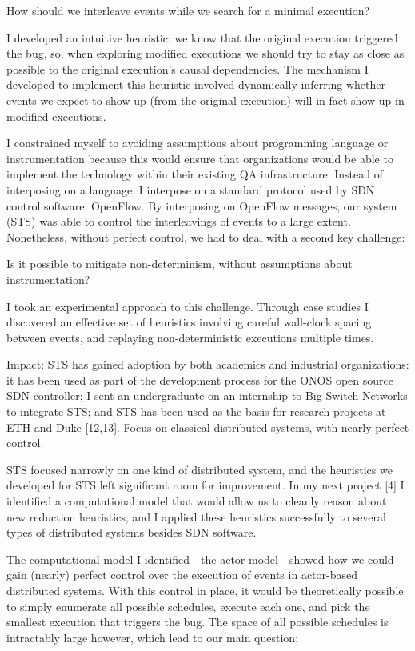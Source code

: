 	How should we interleave events while we search for a minimal execution?

I developed an intuitive heuristic: we know that the original execution triggered the bug, so, when exploring modified executions we should try to stay as close as possible to the original execution’s causal dependencies. The mechanism I developed to implement this heuristic involved dynamically inferring whether events we expect to show up (from the original execution) will in fact show up in modified executions.

I constrained myself to avoiding assumptions about programming language or instrumentation because this would ensure that organizations would be able to implement the technology within their existing QA infrastructure. Instead of interposing on a language, I interpose on a standard protocol used by SDN control software: OpenFlow. By interposing on OpenFlow messages, our system (STS) was able to control the interleavings of events to a large extent. Nonetheless, without perfect control, we had to deal with a second key challenge:

Is it possible to mitigate non-determinism, without assumptions about instrumentation?

I took an experimental approach to this challenge. Through case studies I discovered an effective set of heuristics involving careful wall-clock spacing between events, and replaying non-deterministic executions multiple times.

Impact: STS has gained adoption by both academics and industrial organizations: it has been used as part of the development process for the ONOS open source SDN controller; I sent an undergraduate on an internship to Big Switch Networks to integrate STS; and STS has been used as the basis for research projects at ETH and Duke [12,13].
Focus on classical distributed systems, with nearly perfect control.

STS focused narrowly on one kind of distributed system, and the heuristics we
developed for STS left significant room for improvement. In my next project
[4] I identified a computational model that would allow us to cleanly reason
about new reduction heuristics, and I applied these heuristics successfully to several types of distributed systems besides SDN software.

The computational model I identified---the actor model---showed how we could gain (nearly) perfect control over the execution of events in actor-based distributed systems. With this control in place, it would be theoretically possible to simply enumerate all possible schedules, execute each one, and pick the smallest execution that triggers the bug. The space of all possible schedules is intractably large however, which lead to our main question:

